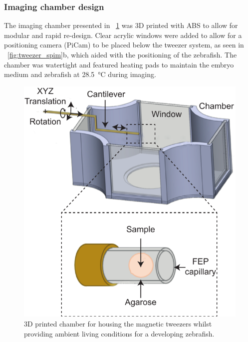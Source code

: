 \subsubsection{Imaging chamber design}

The imaging chamber presented in \figurename~\ref{fig:fep_chamber} was 3D printed with \gls{ABS} to allow for modular and rapid re-design.
Clear acrylic windows were added to allow for a positioning camera (PiCam) to be placed below the tweezer system, as seen in \figurename~\ref{fig:tweezer_spim}b, which aided with the positioning of the \gls{zebrafish}.
The chamber was watertight and featured heating pads to maintain the embryo medium and zebrafish at \SI{28.5}{\celsius} during imaging.


\begin{figure}
 \centering
 \includegraphics{Chapters/tweezers/Figs/PDF/fep_chamber}
 \caption{3D printed chamber for housing the magnetic tweezers whilst providing ambient living conditions for a developing \gls{zebrafish}.}\label{fig:fep_chamber}
\end{figure}

